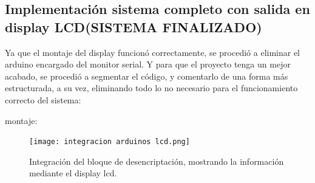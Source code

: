 \documentclass{article}
\begin{document}
\subsection{Implementación sistema completo con salida en display LCD(SISTEMA FINALIZADO)}\label{intento1}
Ya que el montaje del display funcionó correctamente, se procedió a eliminar el arduino encargado del monitor serial. Y para que el proyecto tenga un mejor acabado, se procedió a segmentar el código, y comentarlo de una forma más estructurada, a su vez, eliminando todo lo no necesario para el funcionamiento correcto del sistema:

montaje:
\begin{figure}[h]
\texttt{[image: integracion arduinos lcd.png]}
\centering
\caption{Integración del bloque de desencriptación, mostrando la información mediante el display lcd.}
\label{fig:lcd}
\end{figure}
\end{document}
